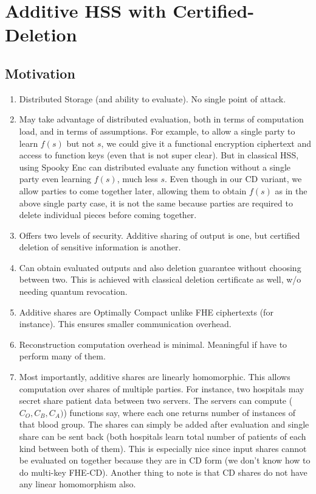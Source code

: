 \section{Additive HSS with Certified-Deletion}

\subsection{Motivation}

\begin{enumerate}
\item Distributed Storage (and ability to evaluate). No single point
of attack.
\item May take advantage of distributed evaluation, both in terms of
computation load, and in terms of assumptions. For example, to allow
a single party to learn $f(s)$ but not $s$, we could give it a
functional encryption ciphertext and access to function keys (even
that is not super clear). But in classical HSS, using Spooky Enc can
distributed evaluate any function without a single party even
learning $f(s)$, much less $s$. Even though in our CD variant, we
allow parties to come together later, allowing them to obtain $f(s)$
as in the above single party case, it is not the same because
parties are required to delete individual pieces before coming
together.

\item Offers two levels of security. Additive sharing of output is
      one, but certified deletion of sensitive information is
      another.
\item Can obtain evaluated outputs and also deletion guarantee
without choosing between two. This is achieved with classical
deletion certificate as well, w/o needing quantum revocation.
\item Additive shares are Optimally Compact unlike FHE ciphertexts
    (for instance). This ensures smaller communication overhead.
\item Reconstruction computation overhead is minimal. Meaningful if
    have to perform many of them.
\item Most importantly, additive shares are linearly homomorphic.
    This allows computation over shares of multiple parties. For
    instance, two hospitals may secret share patient data between
    two servers. The servers can compute ($C_O, C_B, C_A)$)
    functions say, where each one returns number of instances of
    that blood group. The shares can simply be added after
    evaluation and single share can be sent back (both hospitals
    learn total number of patients of each kind between both of
    them). This is especially nice since input shares cannot be
    evaluated on together because they are in CD form (we don't know
    how to do multi-key FHE-CD). Another thing to note is that CD
    shares do not have any linear homomorphism also.
\end{enumerate}

